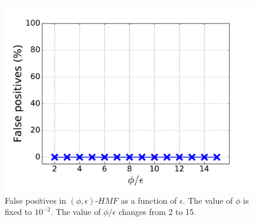 \begin{figure}[!htb]
\endminipage\hfill
{}%
  \includegraphics[width=\linewidth]{figure/fp}
{False positives in $(\phi, \epsilon)\mbox{-}HMF$ as a function of $\epsilon$. The value of $\phi$ is fixed to $10^{-2}$.
The value of $\phi/\epsilon$ changes from 2 to 15.}
  
\endminipage
\vspace{-0.1in}
\end{figure}